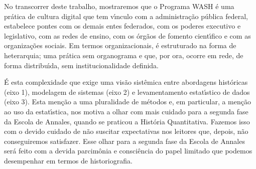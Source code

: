 \documentclass[
12pt,		%
openright,	%
twoside,  %
a4paper,			%
chapter=TITLE,		%
english,			%
french,				%
spanish,			%
brazil				%
]{USPSC-classe/USPSC}
\begin{document}
\noindent\begin{center}\mbox{\centering{}}\end{center}


No transcorrer deste trabalho, mostraremos que o Programa WASH \'e uma pr\'atica de cultura digital que tem v\'{\i}nculo com a administra\c{c}\~ao p\'ublica federal, estabelece pontes com os demais entes federados, com os poderes executivo e legislativo, com as redes de ensino, com os \'org\~aos de fomento cient\'{\i}fico e com as organiza\c{c}\~oes sociais. Em termos organizacionais, \'e estruturado na forma de heterarquia; uma pr\'atica sem organograma e que, por ora, ocorre em rede, de forma distribu\'{\i}da, sem institucionalidade definida.









\'E esta complexidade que exige uma vis\~ao sist\^emica entre abordagens hist\'oricas (eixo 1), modelagem de sistemas (eixo 2) e levamentamento estat\'{\i}stico de dados (eixo 3). Esta men\c{c}\~ao a uma pluralidade de m\'etodos e, em particular, a men\c{c}\~ao ao uso da estat\'{\i}stica, nos motiva a olhar com mais cuidado para a segunda fase da Escola de Annales, quando se praticou a \textquotedbl Hist\'oria Quantitativa\textquotedbl . Fazemos isso com o devido cuidado de n\~ao suscitar expectativas nos leitores que, depois, n\~ao conseguiremos satisfazer. Esse olhar para a segunda fase da Escola de Annales ser\'a feito com a devida parcim\^onia e consci\^encia do papel limitado que podemos desempenhar em termos de historiografia.
\end{document}
